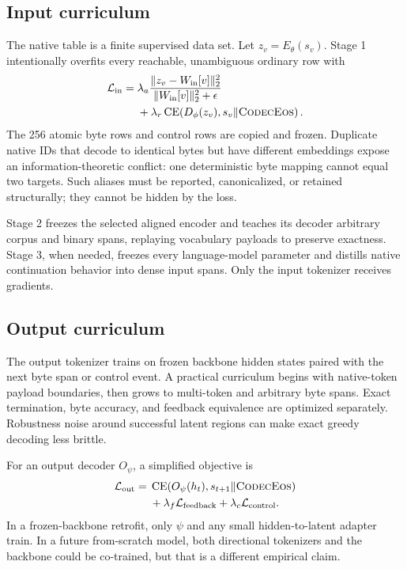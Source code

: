 \documentclass[10pt,twocolumn]{article}
\newcommand{\codeceos}{\textsc{CodecEos}}
\begin{document}
\subsection{Input curriculum}

The native table is a finite supervised data set. Let $z_v=E_\theta(s_v)$. Stage 1 intentionally
overfits every reachable, unambiguous ordinary row with
\begin{equation}
\begin{aligned}
\mathcal{L}_{\mathrm{in}} ={}&
\lambda_a\frac{\|z_v-W_{\mathrm{in}}[v]\|_2^2}
{\|W_{\mathrm{in}}[v]\|_2^2+\epsilon}\\
&+\lambda_r\operatorname{CE}\!\left(D_\phi(z_v),s_v\Vert\codeceos\right).
\end{aligned}
\label{eq:inputloss}
\end{equation}
The 256 atomic byte rows and control rows are copied and frozen. Duplicate native IDs that decode
to identical bytes but have different embeddings expose an information-theoretic conflict: one
deterministic byte mapping cannot equal two targets. Such aliases must be reported, canonicalized,
or retained structurally; they cannot be hidden by the loss.

Stage 2 freezes the selected aligned encoder and teaches its decoder arbitrary corpus and binary
spans, replaying vocabulary payloads to preserve exactness. Stage 3, when needed, freezes every
language-model parameter and distills native continuation behavior into dense input spans. Only
the input tokenizer receives gradients.

\subsection{Output curriculum}

The output tokenizer trains on frozen backbone hidden states paired with the next byte span or
control event. A practical curriculum begins with native-token payload boundaries, then grows to
multi-token and arbitrary byte spans. Exact termination, byte accuracy, and feedback equivalence
are optimized separately. Robustness noise around successful latent regions can make exact greedy
decoding less brittle.

For an output decoder $O_\psi$, a simplified objective is
\begin{equation}
\begin{aligned}
\mathcal{L}_{\mathrm{out}} =
{}&\operatorname{CE}\!\left(O_\psi(h_t),s_{t+1}\Vert\codeceos\right)\\
&+\lambda_f\mathcal{L}_{\mathrm{feedback}}
+\lambda_c\mathcal{L}_{\mathrm{control}}.
\end{aligned}
\end{equation}
In a frozen-backbone retrofit, only $\psi$ and any small hidden-to-latent adapter train. In a future
from-scratch model, both directional tokenizers and the backbone could be co-trained, but that is a
different empirical claim.
\end{document}
